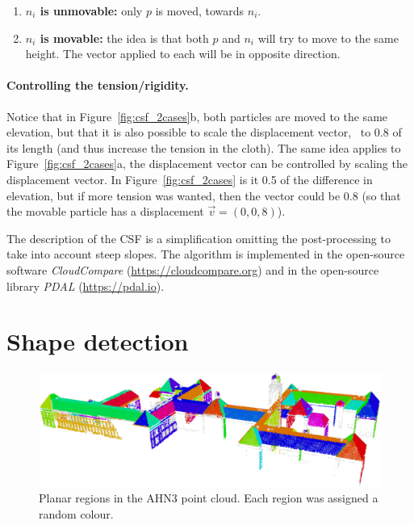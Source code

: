 \begin{enumerate}
  \item \textbf{$n_i$ is unmovable:} only $p$ is moved, towards $n_i$. 
  \item \textbf{$n_i$ is movable:} the idea is that both $p$ and $n_i$ will try to move to the same height. The vector applied to each will be in opposite direction. 
\end{enumerate}

\paragraph{Controlling the tension/rigidity.}
Notice that in Figure~\ref{fig:csf_2cases}b, both particles are moved to the same elevation, but that it is also possible to scale the displacement vector, \eg\ to 0.8 of its length (and thus increase the tension in the cloth).
The same idea applies to Figure~\ref{fig:csf_2cases}a, the displacement vector can be controlled by scaling the displacement vector. 
In Figure~\ref{fig:csf_2cases} is it 0.5 of the difference in elevation, but if more tension was wanted, then the vector could be 0.8 (so that the movable particle has a displacement $\vec{v}=(0, 0, 8)$).


\begin{floatbox}
\begin{kaobox-practice}[frametitle=\faCog\ CSF is implemented in several open-source libraries]
The description of the CSF is a simplification omitting the post-processing to take into account steep slopes.
The algorithm is implemented in the open-source software \emph{CloudCompare} (\url{https://cloudcompare.org}) and in the open-source library \emph{PDAL} (\url{https://pdal.io}).
\end{kaobox-practice}
\end{floatbox}


%
\section{Shape detection}%
\label{sec:shape-detection}

\begin{figure}
	\centering
	\includegraphics[width=\linewidth]{figs/bk-planes.png}
	\caption{Planar regions in the AHN3 point cloud. Each region was assigned a random colour.}%
\label{fig:bk-planes}
\end{figure}

